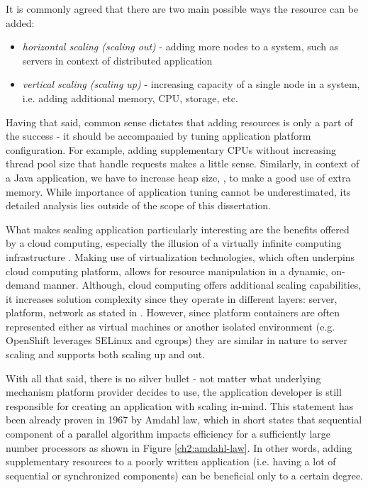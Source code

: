 It is commonly agreed that there are two main possible ways the resource can be added:
\begin{itemize}
	\item \textit{horizontal scaling (scaling out)} - adding more nodes to a system, such as servers in context of distributed application
	\item \textit{vertical scaling (scaling up)} - increasing capacity of a single node in a system, i.e. adding additional memory, CPU, storage, etc.
\end{itemize}

Having that said, common sense dictates that adding resources is only a part of the success - it should be accompanied by tuning application platform configuration. For example, adding supplementary CPUs without increasing thread pool size that handle requests makes a little sense. Similarly, in context of a Java application, we have to increase heap size, , to make a good use of extra memory. While importance of application tuning cannot be underestimated, its detailed analysis lies outside of the scope of this dissertation.

What makes scaling application particularly interesting are the benefits offered by a cloud computing, especially the illusion of a virtually infinite computing infrastructure \cite{VaRoBu11}. Making use of virtualization technologies, which often underpins cloud computing platform, allows for resource manipulation in a dynamic, on-demand manner. Although, cloud computing offers additional scaling capabilities, it increases solution complexity since they operate in different layers: server, platform, network as stated in \cite{VaRoBu11}. However, since platform containers are often represented either as virtual machines or another isolated environment (e.g. OpenShift leverages SELinux and cgroups) they are similar in nature to server scaling and supports both scaling up and out.

With all that said, there is no silver bullet - not matter what underlying mechanism platform provider decides to use, the application developer is still responsible for creating an application with scaling in-mind. This statement has been already proven in 1967 by Amdahl law, which in short states that sequential component of a parallel algorithm impacts efficiency for a sufficiently large number processors \cite{Am67} as shown in Figure \ref{ch2:amdahl-law}. In other words, adding supplementary resources to a poorly written application (i.e. having a lot of sequential or synchronized components) can be beneficial only to a certain degree.

